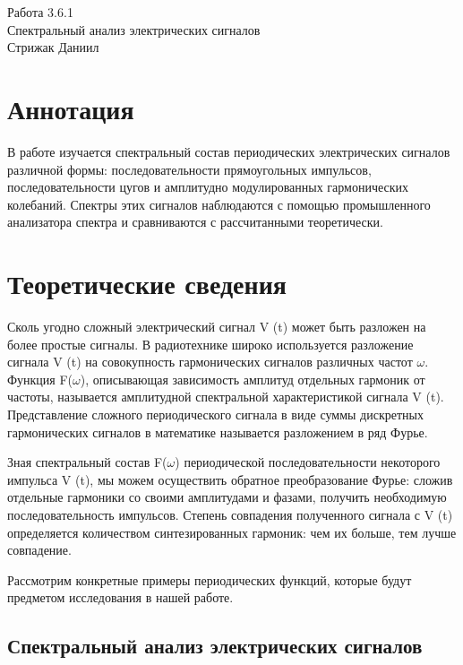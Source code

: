 



\begin{center}
  \LARGE{Работа 3.6.1}\\[0.2cm]
  \LARGE{Спектральный анализ электрических сигналов}\\[0.2cm]
  \large{Стрижак Даниил}\\[0.2cm]
\end{center}  
  

\section{Аннотация}

В работе изучается спектральный состав периодических электрических сигналов различной формы: последовательности прямоугольных импульсов, последовательности цугов и амплитудно модулированных гармонических колебаний. Спектры этих сигналов наблюдаются с помощью промышленного анализатора спектра и сравниваются с рассчитанными теоретически. 

\section{Теоретические сведения}

Сколь угодно сложный электрический сигнал V (t) может быть разложен на более простые сигналы. В радиотехнике широко используется разложение сигнала V (t) на совокупность гармонических сигналов различных частот $\omega$. Функция F($\omega$), описывающая зависимость амплитуд отдельных гармоник от частоты, называется амплитудной спектральной характеристикой сигнала V (t). Представление сложного периодического сигнала в виде суммы дискретных гармонических сигналов в математике называется разложением в ряд Фурье.

Зная спектральный состав F($\omega$) периодической последовательности некоторого импульса V (t), мы можем осуществить обратное преобразование Фурье: сложив отдельные гармоники со своими амплитудами и фазами, получить необходимую последовательность импульсов. Степень совпадения полученного сигнала с V (t) определяется количеством синтезированных гармоник: чем их больше, тем лучше совпадение.

Рассмотрим конкретные примеры периодических функций, которые будут предметом исследования в нашей работе.

\subsection{Спектральный анализ электрических сигналов}


